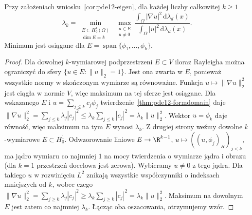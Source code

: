 \begin{twierdzenie}
\label{thm:pde12-minmax}
Przy założeniach wniosku~\ref{cor:pde12-eigen},
dla każdej liczby całkowitej $k\ge1$
\[
\lambda_k=
\min_{\substack{E\subset H_0^1(\Omega)\\\dim E=k}}
\ \max_{\substack{u\in E\\u\ne0}}
\frac{\displaystyle\int_\Omega|\nabla u|^2\,\mathrm d\lambda_d(x)}
{\displaystyle\int_\Omega|u|^2\,\mathrm d\lambda_d(x)}.
\]
Minimum jest osiągane dla $E=\operatorname{span}
\{\phi_1,\ldots,\phi_k\}$.
\end{twierdzenie}
\begin{proof}
Dla dowolnej $k$-wymiarowej podprzestrzeni $E\subset V$
iloraz Rayleigha można ograniczyć do sfery
$\{u\in E:\|u\|_2=1\}$. Jest ona zwarta w $E$,
ponieważ wszystkie normy w skończonym wymiarze są
równoważne. Funkcja $u\mapsto\|\nabla u\|_2^2$ jest
ciągła w normie $V$, więc maksimum na tej sferze
jest osiągane.
Dla wskazanego $E$ i $u=\sum_{j\le k}c_j\phi_j$
twierdzenie~\ref{thm:pde12-formdomain} daje
$\|\nabla u\|_2^2=\sum_{j\le k}\lambda_j|c_j|^2
\le\lambda_k\sum_{j\le k}|c_j|^2=\lambda_k\|u\|_2^2$.
Wektor $u=\phi_k$ daje równość, więc maksimum na tym $E$
wynosi $\lambda_k$. Z drugiej strony weźmy dowolne
$k$-wymiarowe $E\subset H_0^1$. Odwzorowanie liniowe
$E\to\R^{k-1}$, $u\mapsto((u,\phi_j)_H)_{j<k}$,
ma jądro wymiaru co najmniej $1$ na mocy twierdzenia
o wymiarze jądra i obrazu (dla $k=1$ przestrzeń docelowa
jest zerowa). Wybieramy $u\ne0$ z tego jądra.
Dla takiego $u$ w rozwinięciu $L^2$ znikają wszystkie
współczynniki o indeksach mniejszych od $k$, wobec czego
$\|\nabla u\|_2^2=\sum_{j\ge k}\lambda_j|c_j|^2
\ge\lambda_k\sum_{j\ge k}|c_j|^2=\lambda_k\|u\|_2^2$.
Maksimum na dowolnym $E$ jest zatem co najmniej $\lambda_k$.
Łącząc oba oszacowania, otrzymujemy wzór.
\end{proof}

